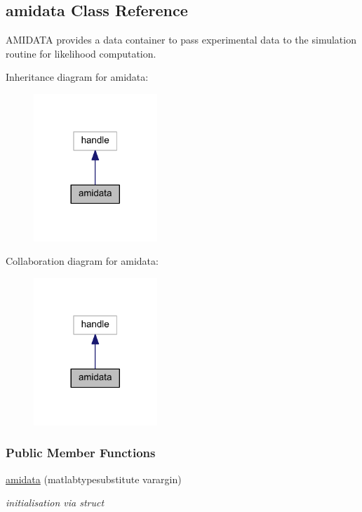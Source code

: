 \hypertarget{classamidata}{}\subsection{amidata Class Reference}
\label{classamidata}


A\+M\+I\+D\+A\+T\+A provides a data container to pass experimental data to the simulation routine for likelihood computation.  




Inheritance diagram for amidata\+:\nopagebreak
\begin{figure}[H]
\begin{center}
\leavevmode
\includegraphics[width=132pt]{classamidata__inherit__graph}
\end{center}
\end{figure}


Collaboration diagram for amidata\+:\nopagebreak
\begin{figure}[H]
\begin{center}
\leavevmode
\includegraphics[width=132pt]{classamidata__coll__graph}
\end{center}
\end{figure}
\subsubsection*{Public Member Functions}
\begin{DoxyCompactItemize}
\item 
\hypertarget{classamidata_a28c05d6ebaf7baa45ff8b2465ce07b3f}{}\hyperlink{classamidata_a28c05d6ebaf7baa45ff8b2465ce07b3f}{amidata} (matlabtypesubstitute varargin)\label{classamidata_a28c05d6ebaf7baa45ff8b2465ce07b3f}

\begin{DoxyCompactList}\small\item\em initialisation via struct \end{DoxyCompactList}\end{DoxyCompactItemize}

